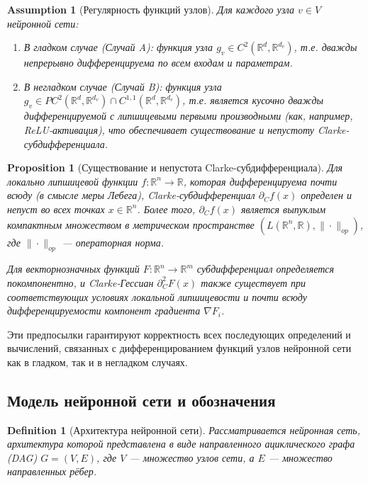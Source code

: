 \documentclass[11pt]{article}
\newtheorem{definition}{Definition}
\newtheorem{proposition}{Proposition}
\newtheorem{assumption}{Assumption}
\begin{document}
\begin{assumption}[Регулярность функций узлов]
  \label{ass:regularity}
  Для каждого узла $v \in V$ нейронной сети:
  \begin{enumerate}
    \item В гладком случае (Случай A): функция узла $g_v \in C^2(\mathbb{R}^d, \mathbb{R}^{d_v})$, т.е.
      дважды непрерывно дифференцируема по всем входам и параметрам.
    \item В негладком случае (Случай B): функция узла $g_v \in PC^2(\mathbb{R}^d, \mathbb{R}^{d_v}) \cap
      C^{1,1}(\mathbb{R}^d, \mathbb{R}^{d_v})$, т.е. является кусочно дважды дифференцируемой с липшицевыми
      первыми производными (как, например, ReLU-активация), что обеспечивает существование и непустоту
      Clarke-субдифференциала.
  \end{enumerate}
\end{assumption}

\begin{proposition}[Существование и непустота Clarke-субдифференциала]
  \label{prop:clarke_existence}
  Для локально липшицевой функции $f: \mathbb{R}^n \to \mathbb{R}$, которая дифференцируема почти всюду (в
  смысле меры Лебега), Clarke-субдифференциал $\partial_C f(x)$ определен и непуст во всех точках $x \in
  \mathbb{R}^n$. Более того, $\partial_C f(x)$ является выпуклым компактным множеством в метрическом
  пространстве $(L(\mathbb{R}^n, \mathbb{R}), \|\cdot\|_{op})$, где $\|\cdot\|_{op}$ — операторная норма.

  Для векторнозначных функций $F: \mathbb{R}^n \to \mathbb{R}^m$ субдифференциал определяется покомпонентно,
  и Clarke-Гессиан $\partial_C^2 F(x)$ также существует при соответствующих условиях локальной липшицевости и
  почти всюду дифференцируемости компонент градиента $\nabla F_i$.
\end{proposition}

Эти предпосылки гарантируют корректность всех последующих определений и вычислений, связанных с
дифференцированием функций узлов нейронной сети как в гладком, так и в негладком случаях.

\subsection{Модель нейронной сети и обозначения}

\begin{definition}[Архитектура нейронной сети]
  Рассматривается нейронная сеть, архитектура которой представлена в виде направленного ациклического графа
  (DAG) $G = (V, E)$, где $V$ — множество узлов сети, а $E$ — множество направленных рёбер.
\end{definition}
\end{document}
